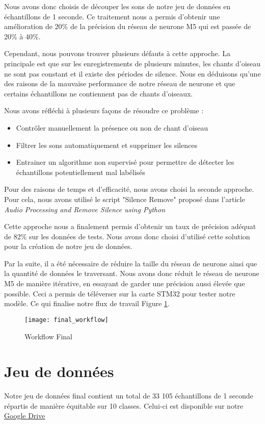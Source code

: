 Nous avons donc choisis de découper les sons de notre jeu de données en échantillons de 1 seconde.
Ce traitement nous a permis d'obtenir une amélioration de 20\% de la précision 
du réseau de neurone M5 qui est passée de 20\% à 40\%. 

Cependant, nous pouvons trouver plusieurs défauts à cette approche. La principale est que sur les enregistrements de plusieurs minutes,
les chants d'oiseau ne sont pas constant et il existe des périodes de silence. 
Nous en déduisons qu'une des raisons de la mauvaise performance de notre réseau de neurone 
et que certains échantillons ne contiennent pas de chants d'oiseaux. 

\pagebreak
Nous avons réfléchi à plusieurs façons de résoudre ce problème : 
\begin{itemize}
  \item Contrôler manuellement la présence ou non de chant d'oiseau 
  \item Filtrer les sons automatiquement et supprimer les silences
  \item Entrainer un algorithme non supervisé pour permettre de détecter les échantillons potentiellement mal labélisés
\end{itemize}

Pour des raisons de temps et d'efficacité, nous avons choisi la seconde approche. Pour cela, nous avons
utilisé le script "Silence Remove" proposé dans l'article \emph{Audio Processing and Remove Silence using Python} \cite{DataCleaning}

 
Cette approche nous a finalement permis d'obtenir un taux de précision adéquat de 82\% sur les données de tests.
Nous avons donc choisi d'utilisé cette solution pour la création de notre jeu de données.

Par la suite, il a été nécessaire de réduire la taille du réseau de neurone ainsi que la quantité de données le traversant.
Nous avons donc réduit le réseau de neurone M5 de manière itérative, en essayant de garder une précision aussi élevée que possible.
Ceci a permis de téléverser sur la carte STM32 pour tester notre modèle.
Ce qui finalise notre flux  de travail Figure \ref{graph:final_workflow}.

\begin{figure}[!ht]
  \texttt{[image: final\_workflow]}
  \centering
  \caption{Workflow Final}
  \label{graph:final_workflow}
\end{figure}


\section{Jeu de données}
Notre jeu de données final contient un total de 33 105 échantillons de 1 seconde 
répartis de manière équitable sur 10 classes. 
Celui-ci est disponible sur notre \href{https://drive.google.com/file/d/1zVLOBS-vfTlgu_EdVVaLhvU9dm-XX1qR/view?usp=sharing}{Google Drive}\cite{Dataset}


